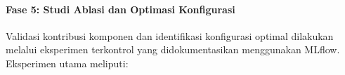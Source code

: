 \documentclass[12pt,a4paper]{book}
\begin{document}
% 

\paragraph{Fase 5: Studi Ablasi dan Optimasi Konfigurasi}
Validasi kontribusi komponen dan identifikasi konfigurasi optimal dilakukan melalui eksperimen terkontrol yang didokumentasikan menggunakan MLflow. Eksperimen utama meliputi:
\end{document}
